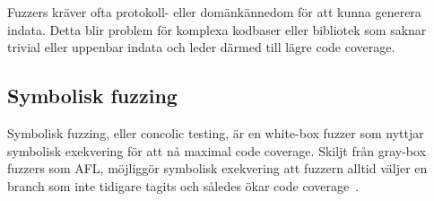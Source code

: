 Fuzzers kräver ofta protokoll- eller domänkännedom för att kunna generera
indata. Detta blir problem för komplexa kodbaser eller bibliotek som saknar
trivial eller uppenbar indata och leder därmed till lägre code coverage.

\subsection{Symbolisk fuzzing}
Symbolisk fuzzing, eller concolic testing, är en white-box fuzzer som nyttjar
symbolisk exekvering för att nå maximal code coverage. Skiljt från gray-box
fuzzers som AFL, möjliggör symbolisk exekvering att fuzzern alltid väljer en
branch som inte tidigare tagits och således ökar code
coverage~\cite{challenges_fuzzing}.  





